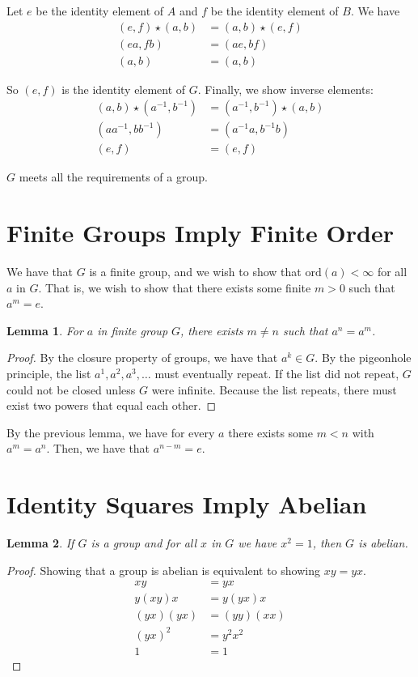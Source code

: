 \documentclass[12pt]{article}
\newtheorem{lemma}{Lemma}
\newcommand*{\ord}{\mathrm{ord}}
\begin{document}
\begin{enumerate}[(a)]
Let $e$ be the identity element of $A$ and $f$ be the identity element of $B$. We have
\begin{align*}
(e, f) \star (a, b) &= (a,b) \star (e, f)\\
(ea, fb) &= (ae, bf)\\
(a, b) &= (a, b)
\end{align*}

So $(e, f)$ is the identity element of $G$. Finally, we show inverse elements:
\begin{align*}
(a, b) \star (a^{-1}, b^{-1}) &= (a^{-1}, b^{-1}) \star (a, b)\\
(aa^{-1}, bb^{-1}) &= (a^{-1}a, b^{-1}b)\\
(e, f) &= (e, f)
\end{align*}

$G$ meets all the requirements of a group.

\end{enumerate}

\section{Finite Groups Imply Finite Order}
We have that $G$ is a finite group, and we wish to show that $\ord(a) < \infty$ for all $a$ in $G$. That is, we wish to show that there exists some finite $m > 0$ such that $a^m = e$. 

\begin{lemma}
For $a$ in finite group $G$, there exists $m \neq n$ such that $a^n = a^m$.
\end{lemma}
\begin{proof}
By the closure property of groups, we have that $a^k \in G$. By the pigeonhole principle, the list $a^1, a^2, a^3,\ldots$ must eventually repeat. If the list did not repeat, $G$ could not be closed unless $G$ were infinite. Because the list repeats, there must exist two powers that equal each other.
\end{proof}

By the previous lemma, we have for every $a$ there exists some $m < n$ with $a^m = a^n$. Then, we have that $a^{n - m} = e$. 

\section{Identity Squares Imply Abelian}
\begin{lemma}
If $G$ is a group and for all $x$ in $G$ we have $x^2 = 1$, then $G$ is abelian.
\end{lemma}
\begin{proof}
Showing that a group is abelian is equivalent to showing $xy = yx$.
\begin{align*}
xy &= yx\\
y(xy)x &= y(yx)x\\
(yx)(yx) &= (yy)(xx)\\
(yx)^2 &= y^2 x^2\\
1 &= 1
\end{align*}

\end{proof}
\end{document}
